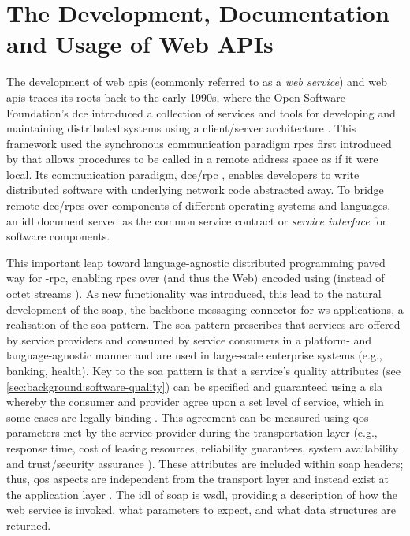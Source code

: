 \graphicspath{{mainmatter/background/figures/}}

\section{The Development, Documentation and Usage of Web APIs}
\label{ssec:background:api:usage}

The development of web \glspl{api} (commonly referred to as a \textit{web service}) and web \glspl{api} traces its roots back to the early 1990s, where  the Open Software Foundation's \gls{dce} introduced a collection of services and tools for developing and maintaining distributed systems using a client/server architecture \citep{Rosenberry:1992up}. This framework used the synchronous communication paradigm \glspl{rpc} first introduced by \citet{Nelson:1981ue} that allows procedures to be called in a remote address space as if it were local. Its communication paradigm, \gls{dce}/\gls{rpc} \citep{OpenSoftwareFoundation:1991vp}, enables developers to write distributed software with underlying network code abstracted away. To bridge remote \gls{dce}/\glspl{rpc} over components of different operating systems and languages, an \gls{idl} document served as the common service contract or \textit{service interface} for software components. 

This important leap toward language-agnostic distributed programming paved way for -\gls{rpc}, enabling \glspl{rpc} over  (and thus the Web) encoded using  (instead of octet streams \citep{OpenSoftwareFoundation:1991vp}). As new functionality was introduced, this lead to the natural development of the \gls{soap}, the backbone messaging connector for \gls{ws} applications, a realisation of the \gls{soa} \citep{Casati:2003vi} pattern. The \gls{soa} pattern prescribes that services are offered by service providers and consumed by service consumers in a platform- and language-agnostic manner and are used in large-scale enterprise systems (e.g., banking, health). Key to the \gls{soa} pattern is that a service's quality attributes (see \cref{sec:background:software-quality}) can be specified and guaranteed using a \gls{sla} whereby the consumer and provider agree upon a set level of service, which in some cases are legally binding \citep{Bass:2003wi}. This agreement can be measured using \gls{qos} parameters met by the service provider during the transportation layer (e.g., response time, cost of leasing resources, reliability guarantees, system availability and trust/security assurance \citep{Hwang:2017tr,Weerawarana:2005wx}). These attributes are included within \gls{soap} headers; thus, \gls{qos} aspects are independent from the transport layer and instead exist at the application layer \citep{Pautasso:2008uw}. The \gls{idl} of \gls{soap} is \gls{wsdl}, providing a description of how the web service is invoked, what parameters to expect, and what data structures are returned.

